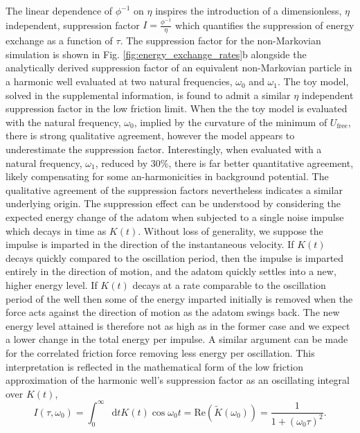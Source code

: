 \documentclass[7pt]{article}
\newcommand*{\diff}{\mathop{}\!\mathrm{d}}
\begin{document}
The linear dependence of $\phi^{-1}$ on $\eta$ inspires the introduction of a dimensionless, $\eta$ independent, suppression factor $I = \frac{\phi^{-1}}{\eta}$ which quantifies the suppression of energy exchange as a function of $\tau$. The suppression factor for the non-Markovian simulation is shown in Fig. \ref{fig:energy_exchange_rates}b alongside the analytically derived suppression factor of an equivalent non-Markovian particle in a harmonic well evaluated at two natural frequencies, $\omega_0$ and $\omega_1$. The toy model, solved in the supplemental information, is found to admit a similar $\eta$ independent suppression factor in the low friction limit. When the the toy model is evaluated with the natural frequency, $\omega_0$, implied by the curvature of the minimum of $U_{\text{free}}$, there is strong qualitative agreement, however the model appears to underestimate the suppression factor. Interestingly, when evaluated with a natural frequency, $\omega_1$, reduced by $30$\%, there is far better quantitative agreement, likely compensating for some an-harmonicities in background potential. The qualitative agreement of the suppression factors nevertheless indicates a similar underlying origin. The suppression effect can be understood by considering the expected energy change of the adatom when subjected to a single noise impulse which decays in time as $K(t)$. Without loss of generality, we suppose the impulse is imparted in the direction of the instantaneous velocity. If $K(t)$ decays quickly compared to the oscillation period, then the impulse is imparted entirely in the direction of motion, and the adatom quickly settles into a new, higher energy level. If $K(t)$ decays at a rate comparable to the oscillation period of the well then some of the energy imparted initially is removed when the force acts against the direction of motion as the adatom swings back. The new energy level attained is therefore not as high as in the former case and we expect a lower change in the total energy per impulse. A similar argument can be made for the correlated friction force removing less energy per oscillation. This interpretation is reflected in the mathematical form of the low friction approximation of the harmonic well's suppression factor as an oscillating integral over $K(t)$,
\begin{equation}
	I(\tau, \omega_0) = \int_0^{\infty}\diff{t}K(t)\cos{\omega_0t} = \mathrm{Re}\left(\tilde{K}(\omega_0)\right) = \frac{1}{1+\left(\omega_0\tau\right)^2}.
	\label{eq:suppression_factor}
\end{equation}
\end{document}
